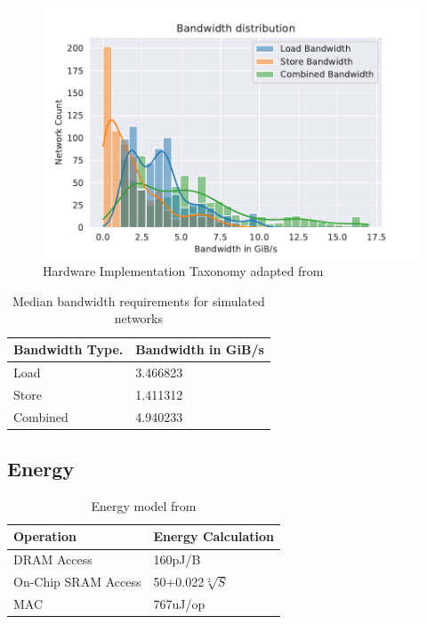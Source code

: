 \begin{figure}[ht]
    \centering
    \includegraphics[scale=0.58]{Plots/resources/net_bw.pdf}
    \caption{Hardware Implementation Taxonomy adapted from \cite{maestro}}
    \label{fig:dram_bw}
\end{figure}

\begin{table}[]
    \center
    \begin{tabular}{|l|l|}
    \toprule
    Bandwidth Type. & Bandwidth in GiB/s    \\ 
    \midrule
    Load            & 3.466823  \\ \hline
    Store          & 1.411312  \\ \hline
    Combined          & 4.940233   \\ \hline
\end{tabular}
\caption{Median bandwidth requirements for simulated networks}
\label{tab:median_dram_bw}
\end{table}

\subsection{Energy}
\label{chap:hero:results:energy}

\begin{table}[]
    \center
    \begin{tabular}{|l|l|}
    \toprule
    Operation & Energy Calculation    \\ 
    \midrule
    DRAM Access                 & 160pJ/B  \\ \hline
    On-Chip SRAM Access         & 50+0.022$\sqrt[2]{S}$  \\ \hline
    MAC                         & 767uJ/op  \\ \hline
\end{tabular}
\caption{Energy model from \cite{area_model}}
\label{tab:energy_model}
\end{table}

